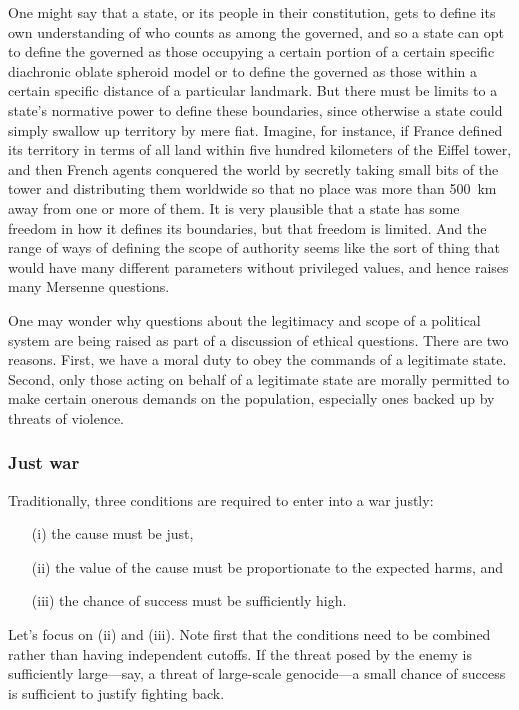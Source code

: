 One might say that a state, or its people in their constitution, gets to define 
its own understanding of who counts as among the governed, and so a state can opt to define the governed as those occupying a 
certain portion of a certain specific diachronic oblate spheroid model or to define the governed as those within a certain specific
distance of a particular landmark. But there must be limits to a state's normative power to define these boundaries, since otherwise
a state could simply swallow up territory by mere fiat. Imagine, for instance, if France defined its territory in terms of all land
within five hundred kilometers of the Eiffel tower, and then French agents conquered the world by secretly taking small bits
of the tower and distributing them worldwide so that no place was more than 500~km away from one or more of them. It is very plausible
that a state has some freedom in how it defines its boundaries, but that freedom is limited. And the range of ways of defining the
scope of authority seems like the sort of thing that would have many different parameters without privileged values, and hence 
raises many Mersenne questions.

One may wonder why questions about the legitimacy and scope of a political system are being raised as part of a discussion of ethical
questions. There are two reasons. First, we have a moral duty to obey the commands of a legitimate state. Second, only those
acting on behalf of a legitimate state are morally permitted to make certain onerous demands on the population, especially ones backed up 
by threats of violence.  

\subsubsection{Just war}
Traditionally, three conditions are required to enter into a war justly: 
\begin{enumerate}
\item[(i)] the cause must be just,
\item[(ii)] the value of the cause must be proportionate to the expected harms, and 
\item[(iii)] the chance of success must be 
sufficiently high. 
\end{enumerate}
Let's focus on (ii) and (iii). Note first that the conditions need to be combined rather than having independent cutoffs. If the threat posed by the enemy is sufficiently large---say, a threat of large-scale genocide---a small chance of success is sufficient to justify fighting back.

